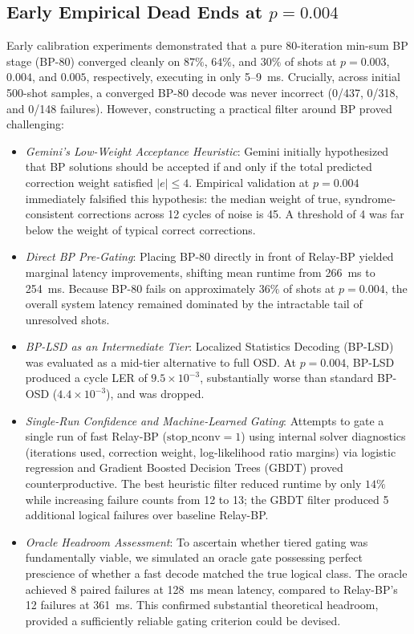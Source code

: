 \subsection{Early Empirical Dead Ends at $p = 0.004$}

Early calibration experiments demonstrated that a pure 80-iteration min-sum BP stage (BP-80) converged cleanly on $87\%$, $64\%$, and $30\%$ of shots at $p = 0.003$, $0.004$, and $0.005$, respectively, executing in only 5--9~ms. Crucially, across initial 500-shot samples, a converged BP-80 decode was never incorrect (0/437, 0/318, and 0/148 failures). However, constructing a practical filter around BP proved challenging:

\begin{itemize}
    \item \textit{Gemini's Low-Weight Acceptance Heuristic}: Gemini initially hypothesized that BP solutions should be accepted if and only if the total predicted correction weight satisfied $|e| \le 4$. Empirical validation at $p = 0.004$ immediately falsified this hypothesis: the median weight of true, syndrome-consistent corrections across 12 cycles of noise is 45. A threshold of 4 was far below the weight of typical correct corrections.
    \item \textit{Direct BP Pre-Gating}: Placing BP-80 directly in front of Relay-BP yielded marginal latency improvements, shifting mean runtime from 266~ms to 254~ms. Because BP-80 fails on approximately $36\%$ of shots at $p = 0.004$, the overall system latency remained dominated by the intractable tail of unresolved shots.
    \item \textit{BP-LSD as an Intermediate Tier}: Localized Statistics Decoding (BP-LSD) was evaluated as a mid-tier alternative to full OSD. At $p = 0.004$, BP-LSD produced a cycle LER of $9.5 \times 10^{-3}$, substantially worse than standard BP-OSD ($4.4 \times 10^{-3}$), and was dropped.
    \item \textit{Single-Run Confidence and Machine-Learned Gating}: Attempts to gate a single run of fast Relay-BP ($\text{stop\_nconv}=1$) using internal solver diagnostics (iterations used, correction weight, log-likelihood ratio margins) via logistic regression and Gradient Boosted Decision Trees (GBDT) proved counterproductive. The best heuristic filter reduced runtime by only $14\%$ while increasing failure counts from 12 to 13; the GBDT filter produced 5 additional logical failures over baseline Relay-BP.
    \item \textit{Oracle Headroom Assessment}: To ascertain whether tiered gating was fundamentally viable, we simulated an oracle gate possessing perfect prescience of whether a fast decode matched the true logical class. The oracle achieved 8 paired failures at 128~ms mean latency, compared to Relay-BP's 12 failures at 361~ms. This confirmed substantial theoretical headroom, provided a sufficiently reliable gating criterion could be devised.
\end{itemize}

